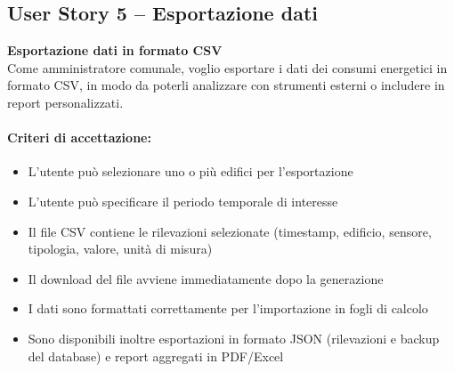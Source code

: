 \subsection{User Story 5 – Esportazione dati}
\label{us:esportazioneDati}

\textbf{Esportazione dati in formato CSV} \\
Come amministratore comunale, voglio esportare i dati dei consumi energetici in formato CSV, in modo da poterli analizzare con strumenti esterni o includere in report personalizzati.

\paragraph*{Criteri di accettazione:}
\begin{itemize}
    \item L'utente può selezionare uno o più edifici per l'esportazione
    \item L'utente può specificare il periodo temporale di interesse
    \item Il file CSV contiene le rilevazioni selezionate (timestamp, edificio, sensore, tipologia, valore, unità di misura)
    \item Il download del file avviene immediatamente dopo la generazione
    \item I dati sono formattati correttamente per l'importazione in fogli di calcolo
    \item Sono disponibili inoltre esportazioni in formato JSON (rilevazioni e backup del database) e report aggregati in PDF/Excel
\end{itemize}

